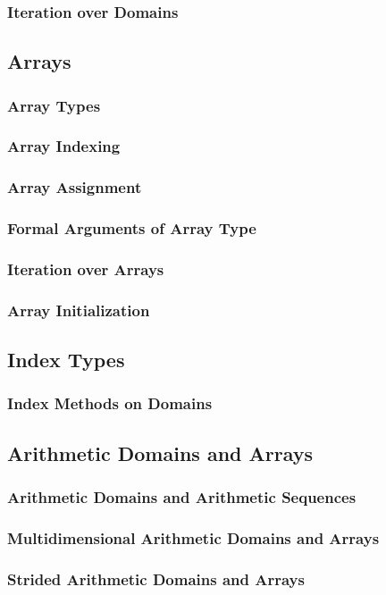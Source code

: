 \documentclass[10pt,twoside,titlepage]{article}
\begin{document}
\subsubsection{Iteration over Domains}
\subsection{Arrays}
\subsubsection{Array Types}
\subsubsection{Array Indexing}
\subsubsection{Array Assignment}
\subsubsection{Formal Arguments of Array Type}
\subsubsection{Iteration over Arrays}
\subsubsection{Array Initialization}
\subsection{Index Types}
\subsubsection{Index Methods on Domains}
\subsection{Arithmetic Domains and Arrays}
\subsubsection{Arithmetic Domains and Arithmetic Sequences}
\subsubsection{Multidimensional Arithmetic Domains and Arrays}
\subsubsection{Strided Arithmetic Domains and Arrays}
\end{document}
